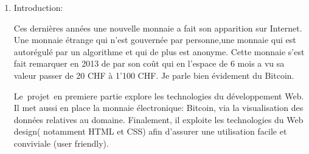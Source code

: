 \documentclass[12pt]{article}
\begin{document}
\begin{enumerate}
\vspace{\baselineskip}

\vspace{\baselineskip}

\vspace{\baselineskip}

\vspace{\baselineskip}
	\item Introduction:\par

{\fontsize{14pt}{16.8pt}\selectfont Ces dernières années une nouvelle monnaie a fait son apparition sur Internet. Une monnaie étrange qui n’est gouvernée par personne,une monnaie qui est autorégulé par un algorithme et qui de plus est anonyme. Cette monnaie s’est fait remarquer en 2013 de par son coût qui en l’espace de 6 mois a vu sa valeur passer de 20 CHF à 1’100 CHF. Je parle bien évidement du Bitcoin.\par}\par

{\fontsize{14pt}{16.8pt}\selectfont Le\ projet\ en premiere partie  explore les technologies du développement Web. Il met aussi en place la monnaie électronique: Bitcoin, via la visualisation des données relatives au domaine. Finalement, il exploite les technologies du Web design( notamment HTML et CSS) afin d’assurer  une utilisation facile et conviviale (user friendly).\par}\par


\vspace{\baselineskip}

\vspace{\baselineskip}

\vspace{\baselineskip}

\vspace{\baselineskip}

\vspace{\baselineskip}

\vspace{\baselineskip}

\vspace{\baselineskip}

\vspace{\baselineskip}

\vspace{\baselineskip}

\vspace{\baselineskip}


\end{enumerate}
\end{document}
